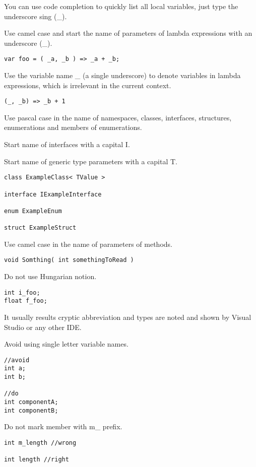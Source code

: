 \documentclass[11pt,a4paper]{book}
\begin{document}
\whymark You can use code completion to quickly list all local variables, just type the underscore sing (\_).

\domark Use camel case and start the name of parameters of lambda expressions with an underscore (\_).
\begin{verbatim}
var foo = ( _a, _b ) => _a + _b;
\end{verbatim}

\domark Use the variable name \_ (a single underscore) to denote variables in lambda expressions, which is irrelevant in the current context.
\begin{verbatim}
(_, _b) => _b + 1
\end{verbatim}

\domark Use pascal case in the name of namespaces, classes, interfaces, structures, enumerations and members of enumerations.

\domark Start name of interfaces with a capital I.

\domark Start name of generic type parameters with a capital T.
\begin{verbatim}
class ExampleClass< TValue >

interface IExampleInterface

enum ExampleEnum

struct ExampleStruct
\end{verbatim}

\domark Use camel case in the name of parameters of methods.
\begin{verbatim}
void Somthing( int somethingToRead )
\end{verbatim}

\notmark Do not use Hungarian notion.
\begin{verbatim}
int i_foo;
float f_foo;
\end{verbatim}

\whymark It usually results cryptic abbreviation and types are noted and shown by Visual Studio or any other IDE.

\avoidmark Avoid using single letter variable names.
\begin{verbatim}
//avoid
int a;
int b;

//do
int componentA;
int componentB;
\end{verbatim}

\notmark Do not mark member with m\_ prefix.
\begin{verbatim}
int m_length //wrong

int length //right
\end{verbatim}
\end{document}
